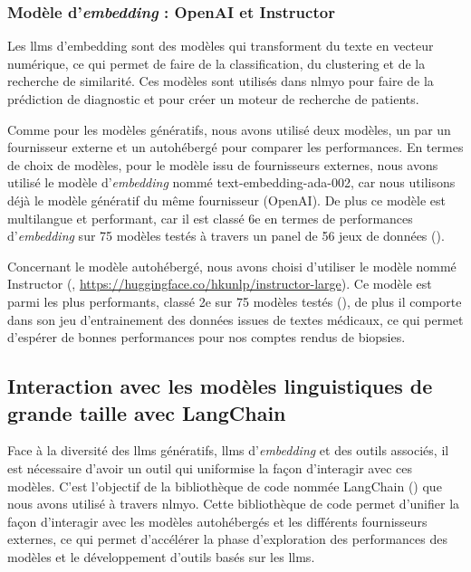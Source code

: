 \subsubsection{Modèle d'\textit{embedding} : OpenAI et Instructor}
Les \gls{llms} d'embedding sont des modèles qui transforment du texte en vecteur numérique, ce qui permet de faire de la classification, du clustering et de la recherche de similarité. Ces modèles sont utilisés dans \gls{nlmyo} pour faire de la prédiction de diagnostic et pour créer un moteur de recherche de patients.

Comme pour les modèles  génératifs, nous avons utilisé deux modèles, un par un fournisseur externe et un autohébergé pour comparer les performances. En termes de choix de modèles, pour le modèle issu de fournisseurs externes, nous avons utilisé le modèle d'\textit{embedding} nommé text-embedding-ada-002, car nous utilisons déjà le modèle génératif du même fournisseur (OpenAI). De plus ce modèle est multilangue et performant, car il est classé 6e en termes de performances d'\textit{embedding} sur 75 modèles testés à travers un panel de 56 jeux de données (\cite{muennighoff_mteb_2022}).

Concernant le modèle autohébergé, nous avons choisi d'utiliser le modèle nommé Instructor (\cite{su_one_2023}, \href{https://huggingface.co/hkunlp/instructor-large}{https://huggingface.co/hkunlp/instructor-large}). Ce modèle est parmi les plus performants, classé 2e sur 75 modèles testés (\cite{muennighoff_mteb_2022}), de plus il comporte dans son jeu d'entrainement des données issues de textes médicaux, ce qui permet d'espérer de bonnes performances pour nos comptes rendus de biopsies. 

\subsection{Interaction avec les modèles linguistiques de grande taille avec LangChain}

Face à la diversité des \gls{llms} génératifs, \gls{llms} d'\textit{embedding} et des outils associés, il est nécessaire d'avoir un outil qui uniformise la façon d'interagir avec ces modèles. C'est l'objectif de la bibliothèque de code nommée LangChain (\cite{chase_harrison_langchain_2022}) que nous avons utilisé à travers \gls{nlmyo}. Cette bibliothèque de code permet d'unifier la façon d'interagir avec les modèles autohébergés et les différents fournisseurs externes, ce qui permet d'accélérer la phase d'exploration des performances des modèles et le développement d'outils basés sur les \gls{llms}. 

